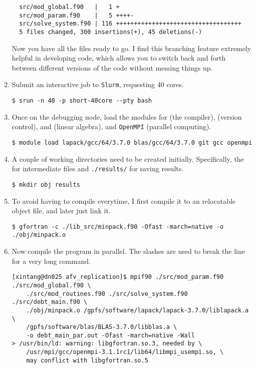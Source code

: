 \documentclass[twoside,11pt,leqno]{article}
\newcommand{\code}{\texttt}
\newcommand{\bcode}[1]{\texttt{\blue{#1}}}
\begin{document}
\begin{enumerate}[1.]
\begin{verbatim}
  src/mod_global.f90   |   1 +
  src/mod_param.f90    |   5 ++++-
  src/solve_system.f90 | 116 +++++++++++++++++++++++++++++++++++
  5 files changed, 300 insertions(+), 45 deletions(-)
\end{verbatim}
    Now you have all the files ready to go. I find this branching feature extremely helpful in developing code, which allows you to switch back and forth between different versions of the code without messing things up.
    \item
    Submit an interactive job to \code{Slurm}, requesting 40 cores.
\begin{verbatim}    
$ srun -n 40 -p short-40core --pty bash
\end{verbatim}
    \item
    Once on the debugging node, load the modules for \bcode{gcc} (the compiler), \bcode{git} (version control), \bcode{LAPACK} and \bcode{BLAS} (linear algebra), and \code{OpenMPI} (parallel computing).
\begin{verbatim}    
$ module load lapack/gcc/64/3.7.0 blas/gcc/64/3.7.0 git gcc openmpi
\end{verbatim}
    \item
    A couple of working directories need to be created initially. Specifically, the \bcode{./obj/} for intermediate files and \code{./results/} for saving results.
\begin{verbatim}
$ mkdir obj results
\end{verbatim}
    \item
    To avoid having to compile \bcode{MINPACK} everytime, I first compile it to an relocatable object file, and later just link it.
\begin{verbatim}
$ gfortran -c ./lib_src/minpack.f90 -Ofast -march=native -o ./obj/minpack.o
\end{verbatim}
    \item
    Now compile the program in parallel. The slashes are used to break the line for a very long command.
\begin{verbatim}    
[xintang@dn025 afv_replication]$ mpif90 ./src/mod_param.f90 ./src/mod_global.f90 \
    ./src/mod_routines.f90 ./src/solve_system.f90 ./src/debt_main.f90 \
    ./obj/minpack.o /gpfs/software/lapack/lapack-3.7.0/liblapack.a \
    /gpfs/software/blas/BLAS-3.7.0/libblas.a \
    -o debt_main_par.out -Ofast -march=native -Wall
> /usr/bin/ld: warning: libgfortran.so.3, needed by \
    /usr/mpi/gcc/openmpi-3.1.1rc1/lib64/libmpi_usempi.so, \
    may conflict with libgfortran.so.5
\end{verbatim}

\end{enumerate}
\end{document}

